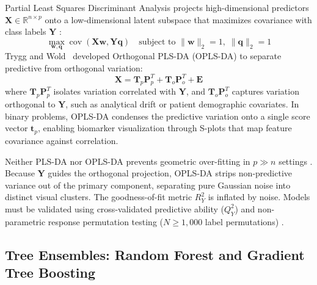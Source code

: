 \documentclass[11pt,oneside]{book}
\begin{document}
Partial Least Squares Discriminant Analysis projects high-dimensional predictors $\mathbf{X} \in \mathbb{R}^{n \times p}$ onto a low-dimensional latent subspace that maximizes covariance with class labels $\mathbf{Y}$ \cite{barker2003partial}:
\begin{equation}
\max_{\mathbf{w}, \mathbf{q}} \operatorname{cov}(\mathbf{X}\mathbf{w}, \mathbf{Y}\mathbf{q}) \quad \text{subject to } \|\mathbf{w}\|_2 = 1, \; \|\mathbf{q}\|_2 = 1
\end{equation}
Trygg and Wold~\cite{trygg2002orthogonal} developed Orthogonal PLS-DA (OPLS-DA) to separate predictive from orthogonal variation:
\begin{equation}
\mathbf{X} = \mathbf{T}_p \mathbf{P}_p^T + \mathbf{T}_o \mathbf{P}_o^T + \mathbf{E}
\end{equation}
where $\mathbf{T}_p \mathbf{P}_p^T$ isolates variation correlated with $\mathbf{Y}$, and $\mathbf{T}_o \mathbf{P}_o^T$ captures variation orthogonal to $\mathbf{Y}$, such as analytical drift or patient demographic covariates. In binary problems, OPLS-DA condenses the predictive variation onto a single score vector $\mathbf{t}_p$, enabling biomarker visualization through S-plots that map feature covariance against correlation.

Neither PLS-DA nor OPLS-DA prevents geometric over-fitting in $p \gg n$ settings \cite{broadhurst2006statistical, westerhuis2008assessment}. Because $\mathbf{Y}$ guides the orthogonal projection, OPLS-DA strips non-predictive variance out of the primary component, separating pure Gaussian noise into distinct visual clusters. The goodness-of-fit metric $R^2_Y$ is inflated by noise. Models must be validated using cross-validated predictive ability ($Q^2_Y$) and non-parametric response permutation testing ($N \ge 1{,}000$ label permutations) \cite{westerhuis2008assessment}.

\subsection{Tree Ensembles: Random Forest and Gradient Tree Boosting}
\end{document}
